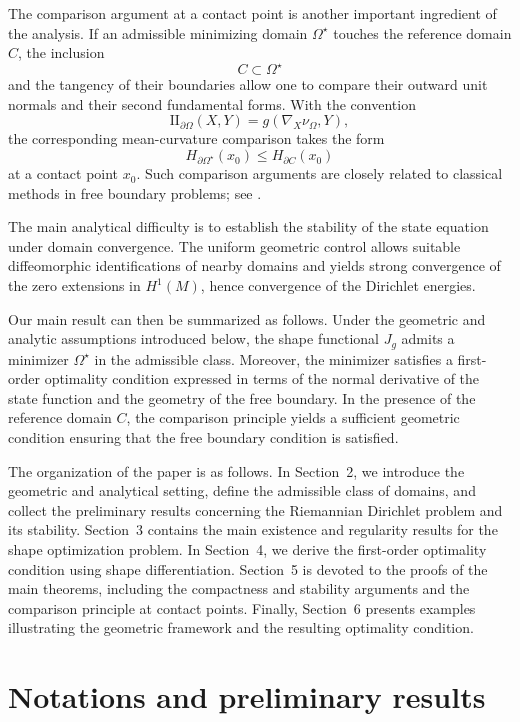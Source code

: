 \documentclass{article}
\begin{document}
The comparison argument at a contact point is another important
ingredient of the analysis. If an admissible minimizing domain
$\Omega^\star$ touches the reference domain $C$, the inclusion
\[
C\subset\Omega^\star
\]
and the tangency of their boundaries allow one to compare their
outward unit normals and their second fundamental forms. With the
convention
\[
\mathrm{II}_{\partial\Omega}(X,Y)
=
g(\nabla_X\nu_\Omega,Y),
\]
the corresponding mean-curvature comparison takes the form
\[
H_{\partial\Omega^\star}(x_0)
\leq
H_{\partial C}(x_0)
\]
at a contact point $x_0$. Such comparison arguments are closely related
to classical methods in free boundary problems; see
\cite{BLS,BLS2,He,sec}.

The main analytical difficulty is to establish the stability of the state equation under domain convergence. The uniform geometric control allows suitable diffeomorphic identifications of nearby domains and yields strong convergence of the zero extensions in $H^1(M)$, hence convergence of the Dirichlet energies.

Our main result can then be summarized as follows. Under the geometric
and analytic assumptions introduced below, the shape functional
$J_g$ admits a minimizer $\Omega^\star$ in the admissible class.
Moreover, the minimizer satisfies a first-order optimality condition
expressed in terms of the normal derivative of the state function and
the geometry of the free boundary. In the presence of the reference
domain $C$, the comparison principle yields a sufficient geometric
condition ensuring that the free boundary condition is satisfied.

The organization of the paper is as follows. In Section~2, we
introduce the geometric and analytical setting, define the admissible
class of domains, and collect the preliminary results concerning the
Riemannian Dirichlet problem and its stability. Section~3 contains the
main existence and regularity results for the shape optimization
problem. In Section~4, we derive the first-order optimality condition
using shape differentiation. Section~5 is devoted to the proofs of the
main theorems, including the compactness and stability arguments and
the comparison principle at contact points. Finally, Section~6 presents
examples illustrating the geometric framework and the resulting
optimality condition.
\section{Notations and preliminary results}
\label{sec:preliminaries}
\end{document}
